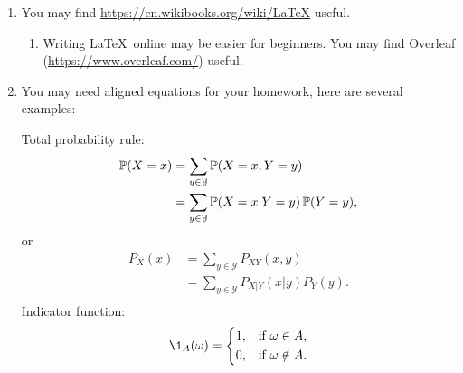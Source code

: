 \documentclass[a4paper]{article}
\begin{document}
\begin{enumerate}
  \setlength{\itemsep}{3\parskip}

\item You may find \url{https://en.wikibooks.org/wiki/LaTeX} useful.
  \begin{enumerate}
    \item Writing \LaTeX\ online may be easier for beginners. You may find Overleaf (\url{https://www.overleaf.com/}) useful.
    \end{enumerate}
  \item You may need aligned equations for your homework, here are several examples:
    
    Total probability rule:
  \begin{equation*}
    \begin{aligned}
      \operatorname{\mathbb{P}}(X = x)
      &= \sum_{y \in \mathcal{Y}} \operatorname{\mathbb{P}}(X = x, Y = y)\\
      &= \sum_{y \in \mathcal{Y}} \operatorname{\mathbb{P}}(X = x| Y = y) \operatorname{\mathbb{P}}(Y = y),\\
    \end{aligned}
  \end{equation*}
  or
  \begin{equation*}
    \begin{aligned}
      P_{X}(x)
      &= \sum_{y \in \mathcal{Y}} P_{XY}(x,y)\\
      &= \sum_{y \in \mathcal{Y}} P_{X|Y}(x|y)P_{Y}(y).\\
    \end{aligned}
  \end{equation*}
  Indicator function:
  \begin{equation*}
    \1_A(\omega)=
    \left\{
    \begin{aligned}
      1, &\quad\text{if}~ \omega \in A,\\
      0, &\quad\text{if}~ \omega \notin A.
    \end{aligned}
    \right.
  \end{equation*}


\end{enumerate}
\end{document}
